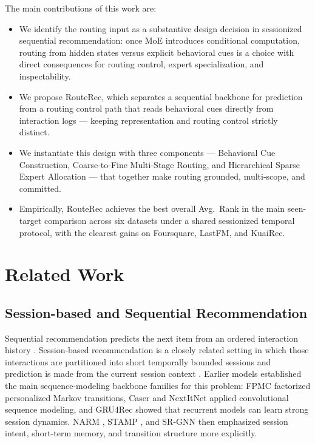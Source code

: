 \documentclass[sigconf,review,anonymous]{acmart}
\begin{document}
The main contributions of this work are:
\begin{itemize}
  \item We identify the routing input as a substantive design decision in sessionized sequential recommendation: once MoE introduces conditional computation, routing from hidden states versus explicit behavioral cues is a choice with direct consequences for routing control, expert specialization, and inspectability.
  \item We propose RouteRec, which separates a sequential backbone for prediction from a routing control path that reads behavioral cues directly from interaction logs — keeping representation and routing control strictly distinct.
  \item We instantiate this design with three components — Behavioral Cue Construction, Coarse-to-Fine Multi-Stage Routing, and Hierarchical Sparse Expert Allocation — that together make routing grounded, multi-scope, and committed.
  \item Empirically, RouteRec achieves the best overall Avg.~Rank in the main seen-target comparison across six datasets under a shared sessionized temporal protocol, with the clearest gains on Foursquare, LastFM, and KuaiRec.
\end{itemize}

\section{Related Work}
\label{sec:related}

\subsection{Session-based and Sequential Recommendation}
Sequential recommendation predicts the next item from an ordered interaction history \cite{wang2019seqsurvey}. Session-based recommendation is a closely related setting in which those interactions are partitioned into short temporally bounded sessions and prediction is made from the current session context \cite{jannach2022sessions,wang2021sessionsurvey}. Earlier models established the main sequence-modeling backbone families for this problem: FPMC \cite{rendle2010fpmc} factorized personalized Markov transitions, Caser \cite{tang2018caser} and NextItNet \cite{yuan2019nextitnet} applied convolutional sequence modeling, and GRU4Rec \cite{hidasi2016gru4rec} showed that recurrent models can learn strong session dynamics. NARM \cite{li2017narm}, STAMP \cite{liu2018stamp}, and SR-GNN \cite{wu2019srgnn} then emphasized session intent, short-term memory, and transition structure more explicitly.
\end{document}
